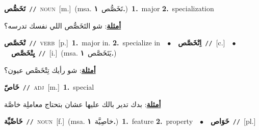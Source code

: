 \documentclass[10pt,a4paper,twoside]{article} %
\begin{document}
\begin{multicols}{2}
{\setlength\topsep{0pt}\textbf{\foreignlanguage{arabic}{تَخَصُّص}}\ {\color{gray}\texttt{//}\color{black}}\ \textsc{noun}\ [m.]\ \color{gray}(msa. \foreignlanguage{arabic}{تَخَصُّص}~\foreignlanguage{arabic}{\textbf{١.}})\color{black}\ \textbf{1.}~major  \textbf{2.}~specialization\  \begin{flushright}\color{gray}\foreignlanguage{arabic}{\textbf{\underline{\foreignlanguage{arabic}{أمثلة}}}: شو التَخَصُّص اللي نفسك تدرسه؟}\end{flushright}\color{black}} \vspace{2mm}

{\setlength\topsep{0pt}\textbf{\foreignlanguage{arabic}{تْخَصَّص}}\ {\color{gray}\texttt{//}\color{black}}\ \textsc{verb}\ [p.]\ \textbf{1.}~major in.  \textbf{2.}~specialize in\ \ $\bullet$\ \ \setlength\topsep{0pt}\textbf{\foreignlanguage{arabic}{اِتْخَصَّص}}\ {\color{gray}\texttt{//}\color{black}}\ [c.]\ \ $\bullet$\ \ \setlength\topsep{0pt}\textbf{\foreignlanguage{arabic}{يِتْخَصَّص}}\ {\color{gray}\texttt{//}\color{black}}\ [i.]\ \color{gray}(msa. \foreignlanguage{arabic}{يَتَخَصَّص}~\foreignlanguage{arabic}{\textbf{١.}})\color{black}\  \begin{flushright}\color{gray}\foreignlanguage{arabic}{\textbf{\underline{\foreignlanguage{arabic}{أمثلة}}}: شو رأيك تِتْخَصَّص عيون؟}\end{flushright}\color{black}} \vspace{2mm}

{\setlength\topsep{0pt}\textbf{\foreignlanguage{arabic}{خَاصّ}}\ {\color{gray}\texttt{//}\color{black}}\ \textsc{adj}\ [m.]\ \textbf{1.}~special\  \begin{flushright}\color{gray}\foreignlanguage{arabic}{\textbf{\underline{\foreignlanguage{arabic}{أمثلة}}}: بدك تدير بالك عليها عشان بتحتاج معاملِة خاصَّة}\end{flushright}\color{black}} \vspace{2mm}

{\setlength\topsep{0pt}\textbf{\foreignlanguage{arabic}{خَاصِّيِّة}}\ {\color{gray}\texttt{//}\color{black}}\ \textsc{noun}\ [f.]\ \color{gray}(msa. \foreignlanguage{arabic}{خاصِيَّة}~\foreignlanguage{arabic}{\textbf{١.}})\color{black}\ \textbf{1.}~feature  \textbf{2.}~property\ \ $\bullet$\ \ \setlength\topsep{0pt}\textbf{\foreignlanguage{arabic}{خَوَاص}}\ {\color{gray}\texttt{//}\color{black}}\ [pl.]\ } \vspace{2mm}


\end{multicols}
\end{document}

